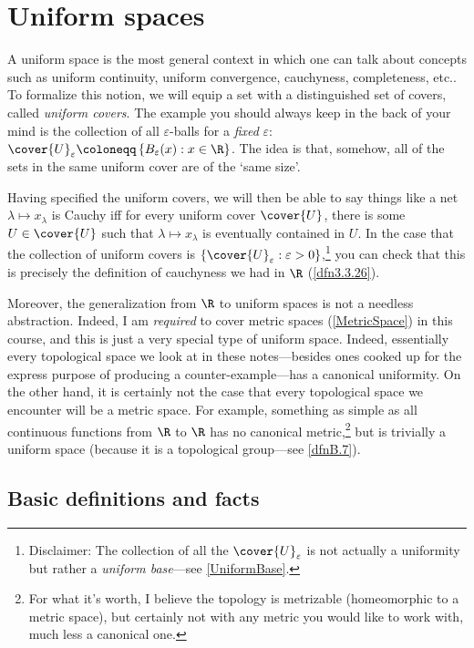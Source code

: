 \chapter{Uniform spaces}\label{chp5}

A uniform space is the most general context in which one can talk about concepts such as uniform continuity, uniform convergence, cauchyness, completeness, etc..  To formalize this notion, we will equip a set with a distinguished set of covers, called \emph{uniform covers}.  The example you should always keep in the back of your mind is the collection of all $\varepsilon$-balls for a \emph{fixed} $\varepsilon$:  $\cover{U}_\varepsilon \coloneqq \left\{ B_\varepsilon (x):x\in \R \right\}$.  The idea is that, somehow, all of the sets in the same uniform cover are of the `same size'.

Having specified the uniform covers, we will then be able to say things like a net $\lambda \mapsto x_\lambda$ is Cauchy iff for every uniform cover $\cover{U}$, there is some $U\in \cover{U}$ such that $\lambda \mapsto x_\lambda$ is eventually contained in $U$.  In the case that the collection of uniform covers is $\left\{ \cover{U}_\varepsilon :\varepsilon >0\right\}$,\footnote{Disclaimer:  The collection of all the $\cover{U}_{\varepsilon}$ is not actually a uniformity but rather a \emph{uniform base}---see \cref{UniformBase}.} you can check that this is precisely the definition of cauchyness we had in $\R$ (\cref{dfn3.3.26}).

Moreover, the generalization from $\R$ to uniform spaces is not a needless abstraction.  Indeed, I am \emph{required} to cover metric spaces (\cref{MetricSpace}) in this course, and this is just a very special type of uniform space.  Indeed, essentially every topological space we look at in these notes---besides ones cooked up for the express purpose of producing a counter-example---has a canonical uniformity.  On the other hand, it is certainly not the case that every topological space we encounter will be a metric space.  For example, something as simple as all continuous functions from $\R$ to $\R$ has no canonical metric,\footnote{For what it's worth, I believe the topology is metrizable (homeomorphic to a metric space), but certainly not with any metric you would like to work with, much less a canonical one.} but is trivially a uniform space (because it is a topological group---see \cref{dfnB.7}).

\section{Basic definitions and facts}

